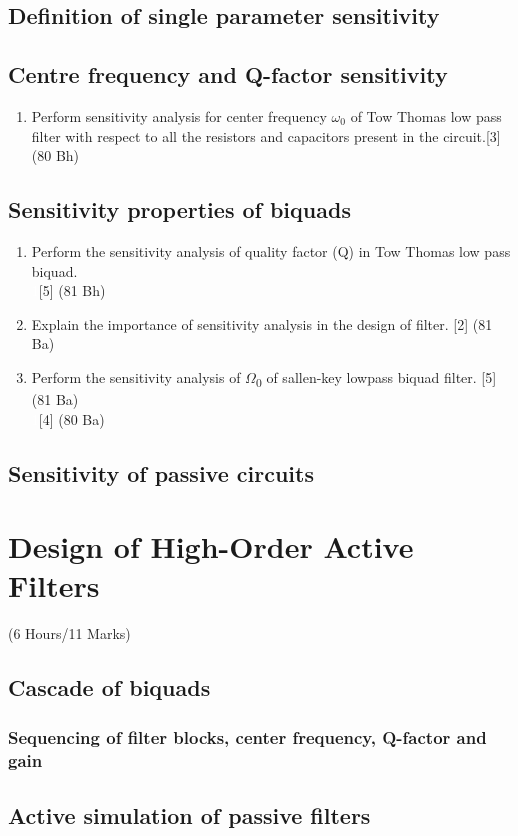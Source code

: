 \documentclass[12pt]{article}
\newcommand{\W}{\(\Omega\)}
\newcommand{\enter}{\\\textcolor{white}{1}}
\begin{document}
\subsection{Definition of single parameter sensitivity}
\subsection{Centre frequency and Q-factor sensitivity}
\begin{enumerate}
\item Perform sensitivity analysis for center frequency $\omega_0$ of Tow Thomas low pass filter with respect to all the resistors and capacitors present in the circuit.\hfill[3] (80 Bh)
\end{enumerate}
\subsection{Sensitivity properties of biquads}
\begin{enumerate}
\item Perform the sensitivity analysis of quality factor (Q) in Tow Thomas low pass biquad.
\enter\hfill [5] (81 Bh)
\item Explain the importance of sensitivity analysis in the design of filter. \hfill[2] (81 Ba)
\item Perform the sensitivity analysis of \W\textsubscript{0} of sallen-key lowpass biquad filter. \hfill [5] (81 Ba)
\enter \hfill [4] (80 Ba)
\end{enumerate}
\subsection{Sensitivity of passive circuits}

\pagebreak
\section{Design of High-Order Active Filters}
\begin{center}(6 Hours/11 Marks)\end{center}
\subsection{Cascade of biquads}
\subsubsection{Sequencing of filter blocks, center frequency, Q-factor and gain}
\subsection{Active simulation of passive filters}
\end{document}
